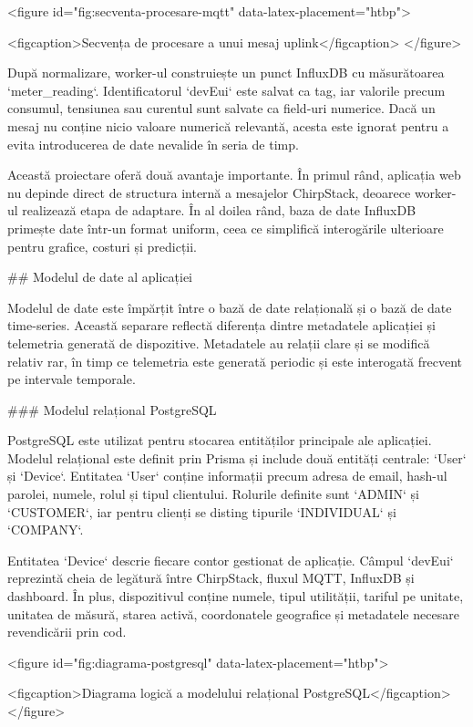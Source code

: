 <figure id="fig:secventa-procesare-mqtt" data-latex-placement="htbp">

<figcaption>Secvența de procesare a unui mesaj uplink</figcaption>
</figure>

După normalizare, worker-ul construiește un punct InfluxDB cu
măsurătoarea `meter_reading`. Identificatorul `devEui` este salvat ca
tag, iar valorile precum consumul, tensiunea sau curentul sunt salvate
ca field-uri numerice. Dacă un mesaj nu conține nicio valoare numerică
relevantă, acesta este ignorat pentru a evita introducerea de date
nevalide în seria de timp.

Această proiectare oferă două avantaje importante. În primul rând,
aplicația web nu depinde direct de structura internă a mesajelor
ChirpStack, deoarece worker-ul realizează etapa de adaptare. În al
doilea rând, baza de date InfluxDB primește date într-un format uniform,
ceea ce simplifică interogările ulterioare pentru grafice, costuri și
predicții.

## Modelul de date al aplicației

Modelul de date este împărțit între o bază de date relațională și o bază
de date time-series. Această separare reflectă diferența dintre
metadatele aplicației și telemetria generată de dispozitive. Metadatele
au relații clare și se modifică relativ rar, în timp ce telemetria este
generată periodic și este interogată frecvent pe intervale temporale.

### Modelul relațional PostgreSQL

PostgreSQL este utilizat pentru stocarea entităților principale ale
aplicației. Modelul relațional este definit prin Prisma și include două
entități centrale: `User` și `Device`. Entitatea `User` conține
informații precum adresa de email, hash-ul parolei, numele, rolul și
tipul clientului. Rolurile definite sunt `ADMIN` și `CUSTOMER`, iar
pentru clienți se disting tipurile `INDIVIDUAL` și `COMPANY`.

Entitatea `Device` descrie fiecare contor gestionat de aplicație. Câmpul
`devEui` reprezintă cheia de legătură între ChirpStack, fluxul MQTT,
InfluxDB și dashboard. În plus, dispozitivul conține numele, tipul
utilității, tariful pe unitate, unitatea de măsură, starea activă,
coordonatele geografice și metadatele necesare revendicării prin cod.

<figure id="fig:diagrama-postgresql" data-latex-placement="htbp">

<figcaption>Diagrama logică a modelului relațional
PostgreSQL</figcaption>
</figure>


